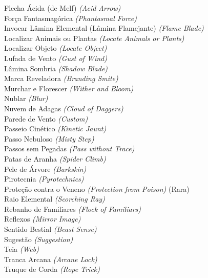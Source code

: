 \documentclass{RPG_Adventure}[2021/10/20]
\begin{document}
{\normalsize Flecha Ácida (de Melf) \textit{(Acid Arrow)}\\ }
{\normalsize Força Fantasmagórica \textit{(Phantasmal Force)}\\ }
{\normalsize Invocar Lâmina Elemental (Lâmina Flamejante) \textit{(Flame Blade)}\\ }
{\normalsize Localizar Animais ou Plantas \textit{(Locate Animals or Plants)}\\ }
{\normalsize Localizar Objeto \textit{(Locate Object)}\\ }
{\normalsize Lufada de Vento \textit{(Gust of Wind)}\\ }
{\normalsize Lâmina Sombria \textit{(Shadow Blade)}\\ }
{\normalsize Marca Reveladora \textit{(Branding Smite)}\\ }
{\normalsize Murchar e Florescer \textit{(Wither and Bloom)}\\ }
{\normalsize Nublar \textit{(Blur)}\\ }
{\normalsize Nuvem de Adagas \textit{(Cloud of Daggers)}\\ }
{\normalsize Parede de Vento \textit{(Custom)}\\ }
{\normalsize Passeio Cinético \textit{(Kinetic Jaunt)}\\ }
{\normalsize Passo Nebuloso \textit{(Misty Step)}\\ }
{\normalsize Passos sem Pegadas \textit{(Pass without Trace)}\\ }
{\normalsize Patas de Aranha \textit{(Spider Climb)}\\ }
{\normalsize Pele de Árvore \textit{(Barkskin)}\\ }
{\normalsize Pirotecnia \textit{(Pyrotechnics)}\\ }
{\normalsize Proteção contra o Veneno \textit{(Protection from Poison)} (Rara)\\ }
{\normalsize Raio Elemental \textit{(Scorching Ray)}\\ }
{\normalsize Rebanho de Familiares \textit{(Flock of Familiars)}\\ }
{\normalsize Reflexos \textit{(Mirror Image)}\\ }
{\normalsize Sentido Bestial \textit{(Beast Sense)}\\ }
{\normalsize Sugestão \textit{(Suggestion)}\\ }
{\normalsize Teia \textit{(Web)}\\ }
{\normalsize Tranca Arcana \textit{(Arcane Lock)}\\ }
{\normalsize Truque de Corda \textit{(Rope Trick)}\\ }
\end{document}
